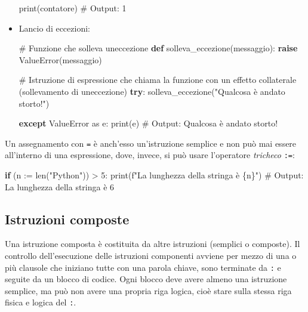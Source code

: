 \documentclass[
  letterpaper,
]{scrbook}
\newenvironment{Shaded}{\begin{snugshade}}{\end{snugshade}}
\newcommand{\BuiltInTok}[1]{\textcolor[rgb]{0.00,0.23,0.31}{#1}}
\newcommand{\CommentTok}[1]{\textcolor[rgb]{0.37,0.37,0.37}{#1}}
\newcommand{\ControlFlowTok}[1]{\textcolor[rgb]{0.00,0.23,0.31}{\textbf{#1}}}
\newcommand{\DecValTok}[1]{\textcolor[rgb]{0.68,0.00,0.00}{#1}}
\newcommand{\ImportTok}[1]{\textcolor[rgb]{0.00,0.46,0.62}{#1}}
\newcommand{\KeywordTok}[1]{\textcolor[rgb]{0.00,0.23,0.31}{\textbf{#1}}}
\newcommand{\NormalTok}[1]{\textcolor[rgb]{0.00,0.23,0.31}{#1}}
\newcommand{\OperatorTok}[1]{\textcolor[rgb]{0.37,0.37,0.37}{#1}}
\newcommand{\PreprocessorTok}[1]{\textcolor[rgb]{0.68,0.00,0.00}{#1}}
\newcommand{\SpecialCharTok}[1]{\textcolor[rgb]{0.37,0.37,0.37}{#1}}
\newcommand{\SpecialStringTok}[1]{\textcolor[rgb]{0.13,0.47,0.30}{#1}}
\newcommand{\StringTok}[1]{\textcolor[rgb]{0.13,0.47,0.30}{#1}}
\begin{document}
\begin{itemize}
\begin{Shaded}
\begin{Highlighting}[]
\BuiltInTok{print}\NormalTok{(contatore)  }\CommentTok{\# Output: 1}
\end{Highlighting}
\end{Shaded}
\item
  Lancio di eccezioni:

\begin{Shaded}
\begin{Highlighting}[]
\CommentTok{\# Funzione che solleva un\textquotesingle{}eccezione}
\KeywordTok{def}\NormalTok{ solleva\_eccezione(messaggio):}
  \ControlFlowTok{raise} \PreprocessorTok{ValueError}\NormalTok{(messaggio)}

\CommentTok{\# Istruzione di espressione che chiama la funzione con un effetto collaterale (sollevamento di un\textquotesingle{}eccezione)}
\ControlFlowTok{try}\NormalTok{:}
\NormalTok{  solleva\_eccezione(}\StringTok{"Qualcosa è andato storto!"}\NormalTok{)}

\ControlFlowTok{except} \PreprocessorTok{ValueError} \ImportTok{as}\NormalTok{ e:}
  \BuiltInTok{print}\NormalTok{(e)  }\CommentTok{\# Output: Qualcosa è andato storto!}
\end{Highlighting}
\end{Shaded}
\end{itemize}

Un assegnamento con \texttt{=} è anch'esso un'istruzione semplice e non
può mai essere all'interno di una espressione, dove, invece, si può
usare l'operatore \emph{tricheco} \texttt{:=}:

\begin{Shaded}
\begin{Highlighting}[]
\ControlFlowTok{if}\NormalTok{ (n }\OperatorTok{:=} \BuiltInTok{len}\NormalTok{(}\StringTok{"Python"}\NormalTok{)) }\OperatorTok{\textgreater{}} \DecValTok{5}\NormalTok{:}
  \BuiltInTok{print}\NormalTok{(}\SpecialStringTok{f"La lunghezza della stringa è }\SpecialCharTok{\{}\NormalTok{n}\SpecialCharTok{\}}\SpecialStringTok{"}\NormalTok{) }
  \CommentTok{\# Output: La lunghezza della stringa è 6}
\end{Highlighting}
\end{Shaded}

\subsection{Istruzioni composte}\label{istruzioni-composte}

Una istruzione composta è costituita da altre istruzioni (semplici o
composte). Il controllo dell'esecuzione delle istruzioni componenti
avviene per mezzo di una o più clausole che iniziano tutte con una
parola chiave, sono terminate da \texttt{:} e seguite da un blocco di
codice. Ogni blocco deve avere almeno una istruzione semplice, ma può
non avere una propria riga logica, cioè stare sulla stessa riga fisica e
logica del \texttt{:}.
\end{document}
